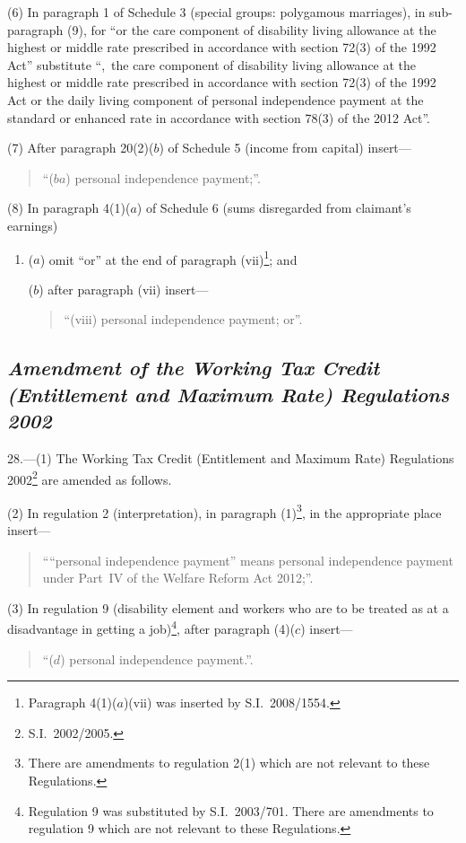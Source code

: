\documentclass[12pt,a4paper]{article}
\begin{document}
(6) In paragraph 1 of Schedule 3 (special groups: polygamous marriages), in sub-paragraph (9), for “or the care component of disability living allowance at the highest or middle rate prescribed in accordance with section 72(3) of the 1992 Act” substitute “,~the care component of disability living allowance at the highest or middle rate prescribed in accordance with section 72(3) of the 1992 Act or the daily living component of personal independence payment at the standard or enhanced rate in accordance with section 78(3) of the 2012 Act”.

(7) After paragraph 20(2)($b$)  of Schedule 5 (income from capital) insert—
\begin{quotation}
“($ba$) personal independence payment;”.
\end{quotation}

(8) In paragraph 4(1)($a$)  of Schedule 6 (sums disregarded from claimant’s earnings)
\begin{enumerate}\item[]
($a$) omit “or” at the end of paragraph (vii)\footnote{Paragraph 4(1)($a$)(vii)  was inserted by S.I.~2008/1554.}; and

($b$) after paragraph (vii)  insert—
\begin{quotation}
“(viii) personal independence payment; or”.
\end{quotation}
\end{enumerate}

\subsection*{\itshape Amendment of the Working Tax Credit (Entitlement and Maximum Rate) Regulations 2002}

28.—(1) The Working Tax Credit (Entitlement and Maximum Rate) Regulations 2002\footnote{S.I.~2002/2005.} are amended as follows.

(2) In regulation 2 (interpretation), in paragraph (1)\footnote{There are amendments to regulation 2(1) which are not relevant to these Regulations.}, in the appropriate place insert—
\begin{quotation}
““personal independence payment” means personal independence payment under Part~IV of the Welfare Reform Act 2012;”.
\end{quotation}

(3) In regulation 9 (disability element and workers who are to be treated as at a disadvantage in getting a job)\footnote{Regulation 9 was substituted by S.I.~2003/701. There are amendments to regulation 9 which are not relevant to these Regulations.}, after paragraph (4)($c$)  insert—
\begin{quotation}
“($d$) personal independence payment.”.
\end{quotation}
\end{document}
